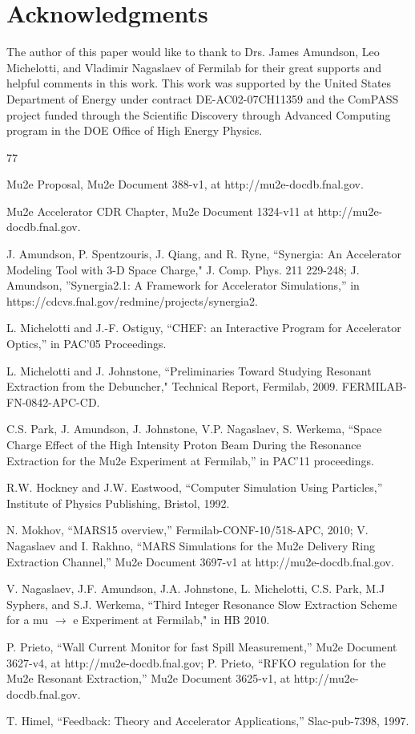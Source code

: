 \documentclass[aps,prstab,showpacs,onecolumn,12pt]{revtex4-1}
\begin{document}
\section{\label{thanks}Acknowledgments}

The author of this paper would like to thank to Drs. James Amundson, Leo Michelotti, and Vladimir Nagaslaev of Fermilab for their great supports and helpful comments in this work. This work was supported by the United States Department of Energy under contract DE-AC02-07CH11359 and the ComPASS project funded through the Scientific Discovery through Advanced Computing program in the DOE Office of High Energy Physics.

\begin{thebibliography}{77}

  Mu2e Proposal, Mu2e Document 388-v1, 
  at http://mu2e-docdb.fnal.gov.

  Mu2e Accelerator CDR Chapter, Mu2e Document 1324-v11
  at http://mu2e-docdb.fnal.gov.

  J. Amundson, P. Spentzouris, J. Qiang, and R. Ryne, ``Synergia: An 
  Accelerator Modeling Tool with 3-D Space Charge," J. Comp. Phys. 211 229-248; J. Amundson, ''Synergia2.1: A Framework for Accelerator Simulations,'' in https://cdcvs.fnal.gov/redmine/projects/synergia2.
  
  L. Michelotti and J.-F. Ostiguy, ``CHEF: an Interactive Program for Accelerator Optics,'' in PAC'05 Proceedings.
  
  L. Michelotti and J. Johnstone, ``Preliminaries Toward Studying Resonant
  Extraction from the Debuncher," Technical Report, Fermilab, 2009.
  FERMILAB-FN-0842-APC-CD.

  C.S. Park, J. Amundson, J. Johnstone, V.P. Nagaslaev, S. Werkema, 
  ``Space Charge Effect of the High Intensity Proton Beam During the Resonance Extraction for the Mu2e Experiment at Fermilab,'' in PAC'11 proceedings.

  R.W. Hockney and J.W. Eastwood, ``Computer Simulation Using Particles,'' Institute of Physics Publishing, Bristol, 1992.

  N. Mokhov, ``MARS15 overview,'' Fermilab-CONF-10/518-APC, 2010; V. Nagaslaev and I. Rakhno, ``MARS Simulations for the Mu2e Delivery Ring Extraction Channel,'' Mu2e Document 3697-v1 at http://mu2e-docdb.fnal.gov.  
  
  V. Nagaslaev, J.F. Amundson, J.A. Johnstone, L. Michelotti, C.S. Park, 
  M.J Syphers, and S.J. Werkema, ``Third Integer Resonance Slow Extraction 
  Scheme for a mu $ \rightarrow $ e Experiment at Fermilab," in HB 2010.

  P. Prieto, ``Wall Current Monitor for fast Spill Measurement,'' Mu2e Document 3627-v4, at http://mu2e-docdb.fnal.gov; P. Prieto, ``RFKO regulation for the Mu2e Resonant Extraction,'' Mu2e Document 3625-v1, at http://mu2e-docdb.fnal.gov.

  T. Himel, ``Feedback: Theory and Accelerator Applications,'' Slac-pub-7398, 1997.

\end{thebibliography}
\end{document}
